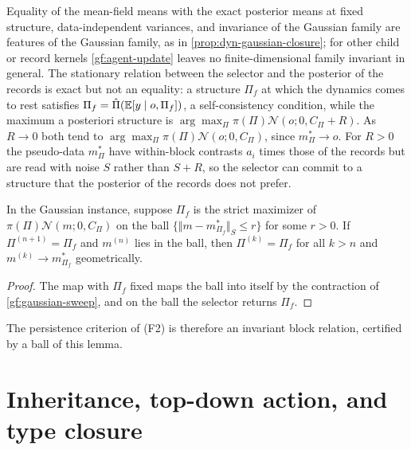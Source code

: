Equality of the mean-field means with the exact posterior means at fixed
structure, data-independent variances, and invariance of the Gaussian family
are features of the Gaussian family, as in \cref{prop:dyn-gaussian-closure};
for other child or record kernels \cref{gf:agent-update} leaves no
finite-dimensional family invariant in general. The stationary relation
between the selector and the posterior of the records is exact but not an
equality: a structure $\Pi_f$ at which the dynamics comes to rest satisfies
$\Pi_f=\hat\Pi(\mathbb E[y\mid o,\Pi_f])$, a self-consistency condition, while the
maximum a posteriori structure is $\arg\max_\Pi\pi(\Pi)\mathcal N(o;0,C_\Pi+R)$.
As $R\to0$ both tend to $\arg\max_\Pi\pi(\Pi)\mathcal N(o;0,C_\Pi)$, since
$m^*_\Pi\to o$. For $R>0$ the pseudo-data $m^*_\Pi$ have within-block
contrasts $a_i$ times those of the records but are read with noise $S$ rather
than $S+R$, so the selector can commit to a structure that the posterior of
the records does not prefer.

In the Gaussian instance, suppose $\Pi_f$ is the strict maximizer of
$\pi(\Pi)\mathcal N(m;0,C_\Pi)$ on the ball
$\{\Vert m-m^*_{\Pi_f}\Vert_S\leq r\}$ for some $r>0$. If $\Pi^{(n+1)}=\Pi_f$ and
$m^{(n)}$ lies in the ball, then $\Pi^{(k)}=\Pi_f$ for all $k>n$ and
$m^{(k)}\to m^*_{\Pi_f}$ geometrically.
\begin{proof}
The map with $\Pi_f$ fixed maps the ball into itself by the contraction of
\cref{gf:gaussian-sweep}, and on the ball the selector returns $\Pi_f$.
\end{proof}

The persistence criterion of (F2) is therefore an invariant block relation,
certified by a ball of this lemma.

\section{Inheritance, top-down action, and type closure}
\label{gf:sec-inheritance}

